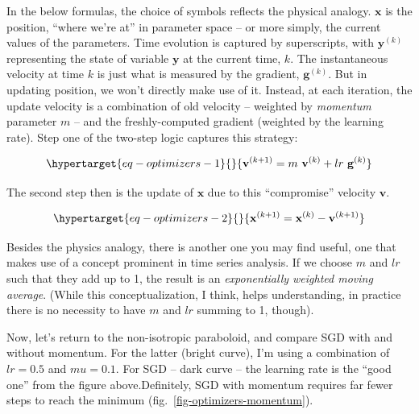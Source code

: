 \documentclass[
  letterpaper,
]{krantz}
\begin{document}
In the below formulas, the choice of symbols reflects the physical
analogy. \(\mathbf{x}\) is the position, ``where we're at'' in parameter
space -- or more simply, the current values of the parameters. Time
evolution is captured by superscripts, with \(\mathbf{y}^{(k)}\)
representing the state of variable \(\mathbf{y}\) at the current time,
\(k\). The instantaneous velocity at time \(k\) is just what is measured
by the gradient, \(\mathbf{g}^{(k)}\). But in updating position, we
won't directly make use of it. Instead, at each iteration, the update
velocity is a combination of old velocity -- weighted by \emph{momentum}
parameter \(m\) -- and the freshly-computed gradient (weighted by the
learning rate). Step one of the two-step logic captures this strategy:

\begin{equation}\protect\hypertarget{eq-optimizers-1}{}{
\mathbf{v}^{(k+1)} = m \ \mathbf{v}^{(k)} + lr \ \mathbf{g}^{(k)} 
}\label{eq-optimizers-1}\end{equation}

The second step then is the update of \(\mathbf{x}\) due to this
``compromise'' velocity \(\mathbf{v}\).

\begin{equation}\protect\hypertarget{eq-optimizers-2}{}{
\mathbf{x}^{(k+1)} = \mathbf{x}^{(k)} - \mathbf{v}^{(k+1)}
}\label{eq-optimizers-2}\end{equation}

Besides the physics analogy, there is another one you may find useful,
one that makes use of a concept prominent in time series analysis. If we
choose \(m\) and \(lr\) such that they add up to 1, the result is an
\emph{exponentially weighted moving average}. (While this
conceptualization, I think, helps understanding, in practice there is no
necessity to have \(m\) and \(lr\) summing to 1, though).

Now, let's return to the non-isotropic paraboloid, and compare SGD with
and without momentum. For the latter (bright curve), I'm using a
combination of \(lr = 0.5\) and \(mu = 0.1\). For SGD -- dark curve --
the learning rate is the ``good one'' from the figure above.Definitely,
SGD with momentum requires far fewer steps to reach the minimum
(fig.~\ref{fig-optimizers-momentum}).
\end{document}
